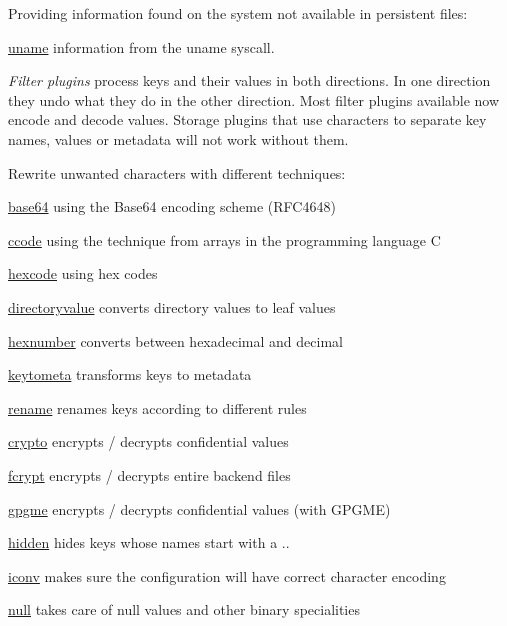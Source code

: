 Providing information found on the system not available in persistent files\+:


\begin{DoxyItemize}
\item \hyperlink{autotoc_md810_src_plugins_uname_README_md}{uname} information from the uname syscall.
\end{DoxyItemize}

{\itshape Filter plugins} process keys and their values in both directions. In one direction they undo what they do in the other direction. Most filter plugins available now encode and decode values. Storage plugins that use characters to separate key names, values or metadata will not work without them.

Rewrite unwanted characters with different techniques\+:


\begin{DoxyItemize}
\item \hyperlink{autotoc_md52_src_plugins_base64_README_md}{base64} using the Base64 encoding scheme (R\+F\+C4648)
\item \hyperlink{autotoc_md78_src_plugins_ccode_README_md}{ccode} using the technique from arrays in the programming language C
\item \hyperlink{autotoc_md255_src_plugins_hexcode_README_md}{hexcode} using hex codes
\end{DoxyItemize}


\begin{DoxyItemize}
\item \hyperlink{autotoc_md172_src_plugins_directoryvalue_README_md}{directoryvalue} converts directory values to leaf values
\item \hyperlink{autotoc_md259_src_plugins_hexnumber_README_md}{hexnumber} converts between hexadecimal and decimal
\item \hyperlink{autotoc_md366_src_plugins_keytometa_README_md}{keytometa} transforms keys to metadata
\item \hyperlink{autotoc_md603_src_plugins_rename_README_md}{rename} renames keys according to different rules
\end{DoxyItemize}


\begin{DoxyItemize}
\item \hyperlink{autotoc_md111_src_plugins_crypto_README_md}{crypto} encrypts / decrypts confidential values
\item \hyperlink{autotoc_md202_src_plugins_fcrypt_README_md}{fcrypt} encrypts / decrypts entire backend files
\item \hyperlink{autotoc_md246_src_plugins_gpgme_README_md}{gpgme} encrypts / decrypts confidential values (with G\+P\+G\+ME)
\item \hyperlink{autotoc_md263_src_plugins_hidden_README_md}{hidden} hides keys whose names start with a {\ttfamily .}.
\item \hyperlink{autotoc_md282_src_plugins_iconv_README_md}{iconv} makes sure the configuration will have correct character encoding
\item \hyperlink{autotoc_md513_src_plugins_null_README_md}{null} takes care of null values and other binary specialities
\end{DoxyItemize}

